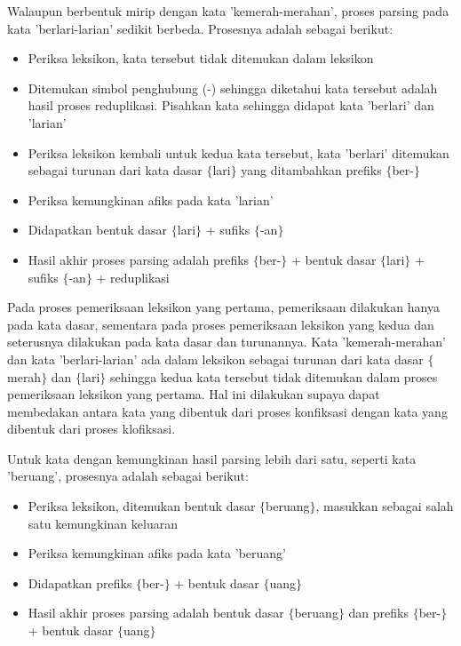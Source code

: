 Walaupun berbentuk mirip dengan kata 'kemerah-merahan', proses parsing pada kata 'berlari-larian' sedikit berbeda. Prosesnya adalah sebagai berikut:
\begin{itemize}
	\item Periksa leksikon, kata tersebut tidak ditemukan dalam leksikon
	\item Ditemukan simbol penghubung (-) sehingga diketahui kata tersebut adalah hasil proses reduplikasi. Pisahkan kata sehingga didapat kata 'berlari' dan 'larian'
	\item Periksa leksikon kembali untuk kedua kata tersebut, kata 'berlari' ditemukan sebagai turunan dari kata dasar $\lbrace$lari$\rbrace$ yang ditambahkan prefiks $\lbrace$ber-$\rbrace$
	\item Periksa kemungkinan afiks pada kata 'larian'
	\item Didapatkan bentuk dasar $\lbrace$lari$\rbrace$ + sufiks $\lbrace$-an$\rbrace$ 
	\item Hasil akhir proses parsing adalah prefiks $\lbrace$ber-$\rbrace$ + bentuk dasar $\lbrace$lari$\rbrace$ + sufiks $\lbrace$-an$\rbrace$ + reduplikasi
\end{itemize}

Pada proses pemeriksaan leksikon yang pertama, pemeriksaan dilakukan hanya pada kata dasar, sementara pada proses pemeriksaan leksikon yang kedua dan seterusnya dilakukan pada kata dasar dan turunannya. Kata 'kemerah-merahan' dan kata 'berlari-larian' ada dalam leksikon sebagai turunan dari kata dasar $\lbrace$merah$\rbrace$ dan $\lbrace$lari$\rbrace$ sehingga kedua kata tersebut tidak ditemukan dalam proses pemeriksaan leksikon yang pertama. Hal ini dilakukan supaya dapat membedakan antara kata yang dibentuk dari proses konfiksasi dengan kata yang dibentuk dari proses klofiksasi.


Untuk kata dengan kemungkinan hasil parsing lebih dari satu, seperti kata 'beruang', prosesnya adalah sebagai berikut:
\begin{itemize}
	\item Periksa leksikon, ditemukan bentuk dasar $\lbrace$beruang$\rbrace$, masukkan sebagai salah satu kemungkinan keluaran
	\item Periksa kemungkinan afiks pada kata 'beruang'
	\item Didapatkan prefiks $\lbrace$ber-$\rbrace$ + bentuk dasar $\lbrace$uang$\rbrace$ 
	\item Hasil akhir proses parsing adalah bentuk dasar $\lbrace$beruang$\rbrace$ dan prefiks $\lbrace$ber-$\rbrace$ + bentuk dasar $\lbrace$uang$\rbrace$
\end{itemize}

